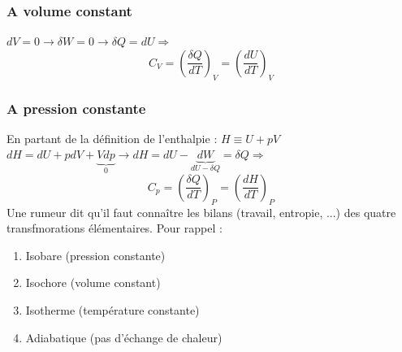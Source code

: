 \documentclass[british,french,11pt, a4paper, openany]{book}
\begin{document}
	\subsubsection*{A volume constant}
	$dV = 0\rightarrow \delta W = 0 \rightarrow \delta Q = dU \Rightarrow$
	\begin{equation}
	C_V = \left(\frac{\delta Q}{dT}\right)_V = \left(\frac{dU}{dT}\right)_V
	\end{equation}
	
	\subsubsection*{A pression constante}
	En partant de la définition de l'enthalpie : $H \equiv U + pV$\\
	$dH = dU + pdV + \underbrace{Vdp}_0 \rightarrow dH =  dU - \underbrace{dW}_{dU-\delta Q} = \delta Q \Rightarrow$
	\begin{equation}
	C_p = \left(\frac{\delta Q}{dT}\right)_P = \left(\frac{dH}{dT}\right)_P
	\end{equation}
	Une rumeur dit qu'il faut connaître les bilans (travail, entropie, ...) des quatre transfmorations élémentaires. Pour rappel :
	\begin{enumerate}
		\item Isobare (pression constante)
		\item Isochore (volume constant)
		\item Isotherme (température constante)
		\item Adiabatique (pas d'échange de chaleur)
	\end{enumerate}
	
\end{document}
